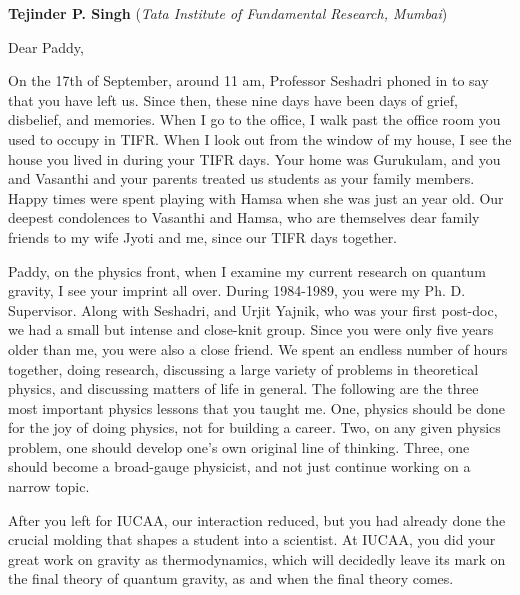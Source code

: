 \documentclass[prd, preprint, longbibliography, 11pt]{revtex4-1}
\begin{document}
\bigskip
\bigskip
\newpage

\centerline{{\bf Tejinder P. Singh} ({\it Tata Institute of Fundamental Research, Mumbai})}
\medskip
{} 

\noindent Dear Paddy,

\noindent On the 17th of September, around 11 am, Professor Seshadri phoned in to say that you have left us. Since then, these nine days have been days of grief, disbelief, and memories. When I go to the office, I walk past the office room you used to occupy in TIFR. When I look out from the window of my house, I see the house you lived in during your TIFR days. Your home was Gurukulam, and you and Vasanthi and your parents treated us students as your family members. Happy times were spent playing with Hamsa when she was just an year old. Our deepest condolences to Vasanthi and Hamsa, who are themselves dear family friends to my wife Jyoti and me, since our TIFR days together.

Paddy, on the physics front, when I examine my current research on quantum gravity, I see your imprint all over. During 1984-1989, you were my Ph. D. Supervisor. Along with Seshadri, and Urjit Yajnik, who was your first post-doc, we had a small but intense and close-knit group. Since you were only five years older than me, you were also a close friend. We spent an endless number of hours together, doing research, discussing a large variety of problems in theoretical physics, and discussing matters of life in general. The following are the three most important physics lessons that you taught me.  One, physics should be done for the joy of doing physics, not for building a career. Two, on any given physics problem, one should develop one’s own original line of thinking. Three, one should become a broad-gauge physicist, and not just continue working on a narrow topic.

After you left for IUCAA, our interaction reduced, but you had already done the crucial molding that shapes a student into a scientist. At IUCAA, you did your great work on gravity as thermodynamics, which will decidedly leave its mark on the final theory of quantum gravity, as and when the final theory comes. 
\end{document}
